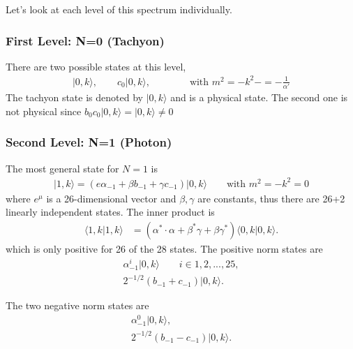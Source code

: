 \documentclass[notitlepage,amsmath,amssymb,aps, pra, 10pt]{revtex4-1}
\begin{document}
        Let's look at each level of this spectrum individually.

        \subsubsection{First Level: N=0 (Tachyon)}

            There are two possible states at this level,
            \begin{align}
                |0, k\rangle, \qquad c_0|0, k\rangle, \qquad \qquad \text{with } m^2 = -k^2 -=-\frac{1}{\alpha'}
            \end{align}
            The tachyon state is denoted by $|0, k\rangle$ and is a physical state. The second one is not physical since $b_0c_0|0, k\rangle = |0, k\rangle \neq 0$

     \subsubsection{Second Level: N=1 (Photon)}

        The most general state for $N=1$ is
        \begin{align}
            |1, k\rangle = (e\alpha_{-1} + \beta b_{-1} + \gamma c_{-1}) |0, k\rangle \qquad \text{with } m^2 = -k^2 = 0
        \end{align}
        where $e^{\mu}$ is a 26-dimensional vector and $\beta, \gamma$ are constants, thus there are 26+2 linearly independent states.
        The inner product is
        \begin{align}
            \langle 1, k | 1, k\rangle &= (
            \alpha^* \cdot \alpha
            +
            \beta^*\gamma
            +
            \beta\gamma^*
            )
            \langle 0, k | 0, k\rangle.
        \end{align}
        which is only positive for 26 of the 28 states. The positive norm states are
        \begin{align}
            \alpha_{-1}^{i} | 0, k\rangle \qquad i\in{1, 2, ..., 25},\\
            2^{-1/2} ( b_{-1} + c_{-1}) | 0, k\rangle.
        \end{align}

        The two negative norm states are
        \begin{align}
            \alpha_{-1} ^ 0 | 0, k\rangle,\\
            2^{-1/2} ( b_{-1} - c_{-1}) | 0, k\rangle.
        \end{align}
\end{document}
